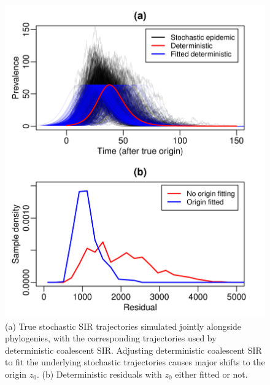 \documentclass[10pt]{article}
\newcommand{\deterCoalSIR}{deterministic coalescent SIR}
\begin{document}
\begin{figure}
  \includegraphics[width=\textwidth]{originFitFigure.jpg}
  \caption{(a) True stochastic SIR trajectories simulated jointly alongside phylogenies, with 
  the corresponding trajectories used by \deterCoalSIR{}.  Adjusting \deterCoalSIR{} 
  to fit the underlying stochastic trajectories causes major shifts to the origin $z_0$.  
  (b) Deterministic residuals with $z_0$ either fitted or not.}
  \label{fig:originFit}
\end{figure}
\end{document}
